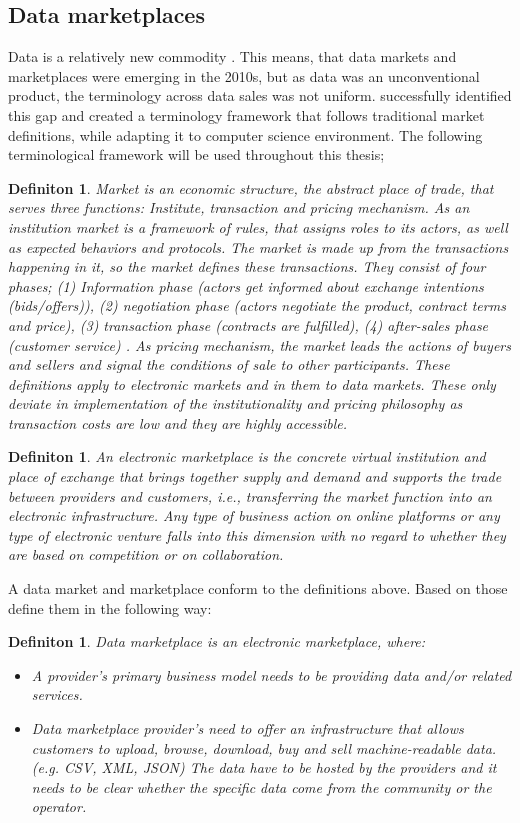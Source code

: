 \documentclass[english, 12pt, a4paper, sci, utf8, a-2b, online]{aaltothesis}
\theoremstyle{change}
\theoremstyle{theoremstyle}
\newtheorem{defi}[theorem]{Definiton}
\begin{document}
\subsection{Data marketplaces}
Data is a relatively new commodity \cite{haav2014data}. This means, that data markets and marketplaces were emerging in the 2010s, but as data was an unconventional product, the terminology across data sales was not uniform. \cite{stahl2016classification} successfully identified this gap and created a terminology framework that follows traditional market definitions, while adapting it to computer science environment. The following terminological framework will be used throughout this thesis;
\begin{defi}
    Market is an economic structure, the abstract place of trade, that serves three functions: Institute, transaction and pricing mechanism. As an institution market is a framework of rules, that assigns roles to its actors, as well as expected behaviors and protocols. The market is made up from the transactions happening in it, so the market defines these transactions. They consist of four phases; (1) Information phase (actors get informed about exchange intentions (bids/offers)), (2) negotiation phase (actors negotiate the product, contract terms and price), (3) transaction phase (contracts are fulfilled), (4) after-sales phase (customer service) \cite{richter2002elektronische}. As pricing mechanism, the market leads the actions of buyers and sellers and signal the conditions of sale to other participants. These definitions apply to electronic markets and in them to data markets. These only deviate in implementation of the institutionality and pricing philosophy as transaction costs are low and they are highly accessible.
\end{defi}
\begin{defi}
    An electronic marketplace is the concrete virtual institution and place of exchange that brings together supply and demand and supports the trade between providers and customers, i.e., transferring the market function into an electronic infrastructure. Any type of business action on online platforms or any type of electronic venture falls into this dimension with no regard to whether they are based on competition or on collaboration.
\end{defi}
A data market and marketplace conform to the definitions above. Based on those \cite{stahl2016classification} define them in the following way:
\begin{defi}
    Data marketplace is an electronic marketplace, where:
    \begin{itemize}
        \item A provider's primary business model needs to be providing data and/or related services. 
        \item Data marketplace provider's need to offer an infrastructure that allows customers to upload, browse, download, buy and sell machine-readable data. (e.g. CSV, XML, JSON) The data have to be hosted by the providers and it needs to be clear whether the specific data come from the community or the operator.
    \end{itemize}
\end{defi}
\end{document}
